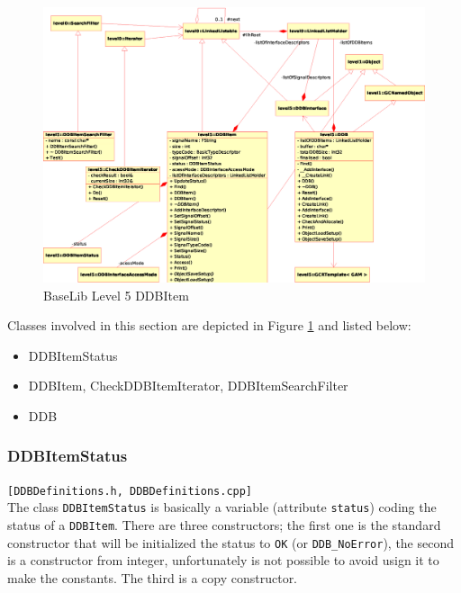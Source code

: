 \begin{figure}[h!]
 \begin{center}
  \includegraphics[width=\textwidth]{level5/level5-DDBItem.eps}
  \caption{BaseLib Level 5 DDBItem}
  \label{f:level5:DDBItem}
 \end{center}
\end{figure}

Classes involved in this section are depicted in Figure \ref{f:level5:DDBItem} and listed below:
\begin{itemize}
 \item DDBItemStatus
 \item DDBItem, CheckDDBItemIterator, DDBItemSearchFilter
 \item DDB
\end{itemize}



\subsubsection{DDBItemStatus}
\texttt{[DDBDefinitions.h, DDBDefinitions.cpp]}\\
The class \texttt{DDBItemStatus} is basically a variable (attribute \texttt{status}) coding the status of a \texttt{DDBItem}.
There are three constructors; the first one is the standard constructor that will be initialized the status to \texttt{OK} (or \texttt{DDB\_NoError}), the second is a constructor from integer, unfortunately is not possible to avoid usign it to make the constants. The third is a copy constructor.

